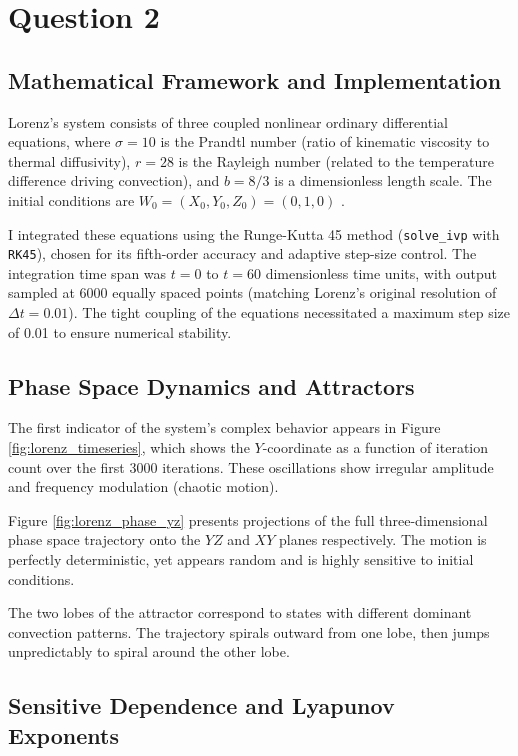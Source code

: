 \documentclass[11pt]{article}
\begin{document}
\newpage

\section{Question 2}

\subsection{Mathematical Framework and Implementation}

Lorenz's system consists of three coupled nonlinear ordinary differential equations, where $\sigma = 10$ is the Prandtl number (ratio of kinematic viscosity to thermal diffusivity), $r = 28$ is the Rayleigh number (related to the temperature difference driving convection), and $b = 8/3$ is a dimensionless length scale. The initial conditions are $W_0 = (X_0, Y_0, Z_0) = (0, 1, 0)$ \cite{lorenz1963}.

I integrated these equations using the Runge-Kutta 45 method (\texttt{solve\_ivp} with \texttt{RK45}), chosen for its fifth-order accuracy and adaptive step-size control. The integration time span was $t = 0$ to $t = 60$ dimensionless time units, with output sampled at 6000 equally spaced points (matching Lorenz's original resolution of $\Delta t = 0.01$). The tight coupling of the equations necessitated a maximum step size of 0.01 to ensure numerical stability.

\subsection{Phase Space Dynamics and Attractors}

The first indicator of the system's complex behavior appears in Figure \ref{fig:lorenz_timeseries}, which shows the $Y$-coordinate as a function of iteration count over the first 3000 iterations. These oscillations show irregular amplitude and frequency modulation (chaotic motion).

Figure \ref{fig:lorenz_phase_yz} presents projections of the full three-dimensional phase space trajectory onto the $YZ$ and $XY$ planes respectively. The motion is perfectly deterministic, yet appears random and is highly sensitive to initial conditions.

The two lobes of the attractor correspond to states with different dominant convection patterns. The trajectory spirals outward from one lobe, then jumps unpredictably to spiral around the other lobe. 

\subsection{Sensitive Dependence and Lyapunov Exponents}
\end{document}
